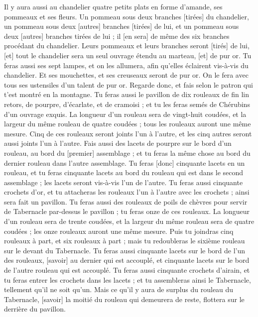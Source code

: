 \begin{multicols}{2}
Il y aura aussi au chandelier quatre petits plats en forme d'amande, ses pommeaux et ses fleurs.
Un pommeau sous deux branches [tirées] du chandelier, un pommeau sous deux [autres] branches [tirées] de lui, et un pommeau sous deux [autres] branches tirées de lui ; il [en sera] de même des six branches procédant du chandelier.
Leurs pommeaux et leurs branches seront [tirés] de lui, [et] tout le chandelier sera un seul ouvrage étendu au marteau, [et] de pur or.
Tu feras aussi ses sept lampes, et on les allumera, afin qu'elles éclairent vis-à-vis du chandelier.
Et ses mouchettes, et ses creuseaux seront de pur or.
On le fera avec tous ses ustensiles d'un talent de pur or.
Regarde donc, et fais selon le patron qui t'est montré en la montagne.
\VerseOne{}Tu feras aussi le pavillon de dix rouleaux de fin lin retors, de pourpre, d'écarlate, et de cramoisi ; et tu les feras semés de Chérubins d'un ouvrage exquis.
La longueur d'un rouleau sera de vingt-huit coudées, et la largeur du même rouleau de quatre coudées ; tous les rouleaux auront une même mesure.
Cinq de ces rouleaux seront joints l'un à l'autre, et les cinq autres seront aussi joints l'un à l'autre.
Fais aussi des lacets de pourpre sur le bord d'un rouleau, au bord du [premier] assemblage ; et tu feras la même chose au bord du dernier rouleau dans l'autre assemblage.
Tu feras [donc] cinquante lacets en un rouleau, et tu feras cinquante lacets au bord du rouleau qui est dans le second assemblage ; les lacets seront vis-à-vis l'un de l'autre.
Tu feras aussi cinquante crochets d'or, et tu attacheras les rouleaux l'un à l'autre avec les crochets ; ainsi sera fait un pavillon.
Tu feras aussi des rouleaux de poils de chèvres pour servir de Tabernacle par-dessus le pavillon ; tu feras onze de ces rouleaux.
La longueur d'un rouleau sera de trente coudées, et la largeur du même rouleau sera de quatre coudées ; les onze rouleaux auront une même mesure.
Puis tu joindras cinq rouleaux à part, et six rouleaux à part ; mais tu redoubleras le sixième rouleau sur le devant du Tabernacle.
Tu feras aussi cinquante lacets sur le bord de l'un des rouleaux, [savoir] au dernier qui est accouplé, et cinquante lacets sur le bord de l'autre rouleau qui est accouplé.
Tu feras aussi cinquante crochets d'airain, et tu feras entrer les crochets dans les lacets ; et tu assembleras ainsi le Tabernacle, tellement qu'il ne soit qu'un.
Mais ce qu'il y aura de surplus du rouleau du Tabernacle, [savoir] la moitié du rouleau qui demeurera de reste, flottera sur le derrière du pavillon.

\end{multicols}
